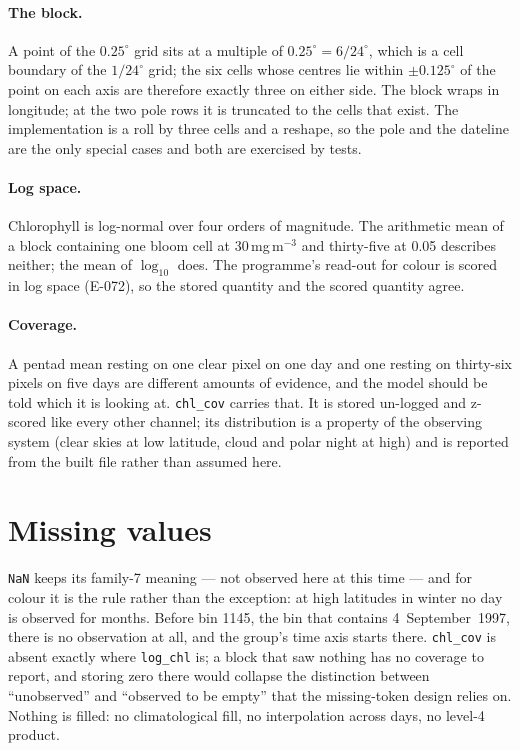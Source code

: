 \documentclass[10pt]{article}
\newcommand{\code}[1]{\texttt{#1}}
\begin{document}
\paragraph{The block.} A point of the $0.25^\circ$ grid sits at a multiple of
$0.25^\circ = 6/24^\circ$, which is a cell boundary of the $1/24^\circ$ grid;
the six cells whose centres lie within $\pm 0.125^\circ$ of the point on each
axis are therefore exactly three on either side. The block wraps in
longitude; at the two pole rows it is truncated to the cells that exist. The
implementation is a roll by three cells and a reshape, so the pole and the
dateline are the only special cases and both are exercised by tests.

\paragraph{Log space.} Chlorophyll is log-normal over four orders of
magnitude. The arithmetic mean of a block containing one bloom cell at
30\,mg\,m$^{-3}$ and thirty-five at 0.05 describes neither; the mean of
$\log_{10}$ does. The programme's read-out for colour is scored in log space
(E-072), so the stored quantity and the scored quantity agree.

\paragraph{Coverage.} A pentad mean resting on one clear pixel on one day and
one resting on thirty-six pixels on five days are different amounts of
evidence, and the model should be told which it is looking at.
\code{chl\_cov} carries that. It is stored un-logged and z-scored like every
other channel; its distribution is a property of the observing system (clear
skies at low latitude, cloud and polar night at high) and is reported from
the built file rather than assumed here.

\section{Missing values}

\code{NaN} keeps its family-7 meaning --- not observed here at this time ---
and for colour it is the rule rather than the exception: at high latitudes in
winter no day is observed for months. Before bin 1145, the bin that contains
4~September~1997, there is no observation at all, and the group's time axis
starts there. \code{chl\_cov} is absent exactly where \code{log\_chl} is; a
block that saw nothing has no coverage to report, and storing zero there would
collapse the distinction between ``unobserved'' and ``observed to be empty''
that the missing-token design relies on. Nothing is filled: no climatological
fill, no interpolation across days, no level-4 product.
\end{document}
